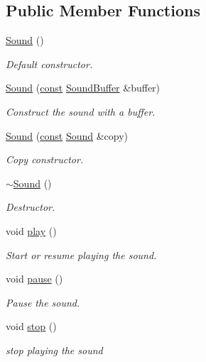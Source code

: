 \subsection*{Public Member Functions}
\begin{DoxyCompactItemize}
\item 
\hyperlink{classsf_1_1_sound_a36ab74beaaa953d9879c933ddd246282}{Sound} ()
\begin{DoxyCompactList}\small\item\em Default constructor. \end{DoxyCompactList}\item 
\hyperlink{classsf_1_1_sound_a3b1cfc19a856d4ff8c079ee41bb78e69}{Sound} (\hyperlink{term__entry_8h_a57bd63ce7f9a353488880e3de6692d5a}{const} \hyperlink{classsf_1_1_sound_buffer}{Sound\-Buffer} \&buffer)
\begin{DoxyCompactList}\small\item\em Construct the sound with a buffer. \end{DoxyCompactList}\item 
\hyperlink{classsf_1_1_sound_ae05eeed6377932694d86b3011be366c0}{Sound} (\hyperlink{term__entry_8h_a57bd63ce7f9a353488880e3de6692d5a}{const} \hyperlink{classsf_1_1_sound}{Sound} \&copy)
\begin{DoxyCompactList}\small\item\em Copy constructor. \end{DoxyCompactList}\item 
\hyperlink{classsf_1_1_sound_ad0792c35310eba2dffd8489c80fad076}{$\sim$\-Sound} ()
\begin{DoxyCompactList}\small\item\em Destructor. \end{DoxyCompactList}\item 
void \hyperlink{classsf_1_1_sound_a2953ffe632536e72e696fd880ced2532}{play} ()
\begin{DoxyCompactList}\small\item\em Start or resume playing the sound. \end{DoxyCompactList}\item 
void \hyperlink{classsf_1_1_sound_a5eeb25815bfa8cdc4a6cc000b7b19ad5}{pause} ()
\begin{DoxyCompactList}\small\item\em Pause the sound. \end{DoxyCompactList}\item 
void \hyperlink{classsf_1_1_sound_aa9c91c34f7c6d344d5ee9b997511f754}{stop} ()
\begin{DoxyCompactList}\small\item\em stop playing the sound \end{DoxyCompactList}\item 

\end{DoxyCompactItemize}
